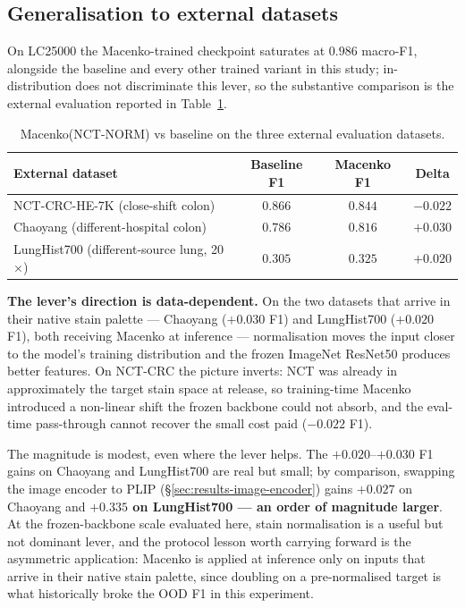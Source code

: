 \subsection{Generalisation to external datasets}

On LC25000 the Macenko-trained checkpoint saturates at $0.986$ macro-F1, alongside the baseline and every other trained variant in this study; in-distribution does not discriminate this lever, so the substantive comparison is the external evaluation reported in Table~\ref{tab:stain-3way}.

\begin{table}[H]
    \centering
    \small
    \begin{tabular}{|l|c|c|c|}
    \hline
    \textbf{External dataset} & \textbf{Baseline F1} & \textbf{Macenko F1} & \textbf{Delta} \\ \hline
    NCT-CRC-HE-7K (close-shift colon)         & $0.866$ & $0.844$ & $-0.022$ \\ \hline
    Chaoyang (different-hospital colon)       & $0.786$ & $0.816$ & $+0.030$ \\ \hline
    LungHist700 (different-source lung, 20$\times$)  & $0.305$ & $0.325$ & $+0.020$ \\ \hline
    \end{tabular}
    \caption{Macenko(NCT-NORM) vs baseline on the three external evaluation datasets.}
    \label{tab:stain-3way}
\end{table}

\textbf{The lever's direction is data-dependent.} On the two datasets that arrive in their native stain palette --- Chaoyang ($+0.030$ F1) and LungHist700 ($+0.020$ F1), both receiving Macenko at inference --- normalisation moves the input closer to the model's training distribution and the frozen ImageNet ResNet50 produces better features. On NCT-CRC the picture inverts: NCT was already in approximately the target stain space at release, so training-time Macenko introduced a non-linear shift the frozen backbone could not absorb, and the eval-time pass-through cannot recover the small cost paid ($-0.022$ F1).

The magnitude is modest, even where the lever helps. The $+0.020$--$+0.030$ F1 gains on Chaoyang and LungHist700 are real but small; by comparison, swapping the image encoder to PLIP (§\ref{sec:results-image-encoder}) gains $+0.027$ on Chaoyang and \textbf{$\mathbf{+0.335}$ on LungHist700 --- an order of magnitude larger}. At the frozen-backbone scale evaluated here, stain normalisation is a useful but not dominant lever, and the protocol lesson worth carrying forward is the asymmetric application: Macenko is applied at inference only on inputs that arrive in their native stain palette, since doubling on a pre-normalised target is what historically broke the OOD F1 in this experiment.


